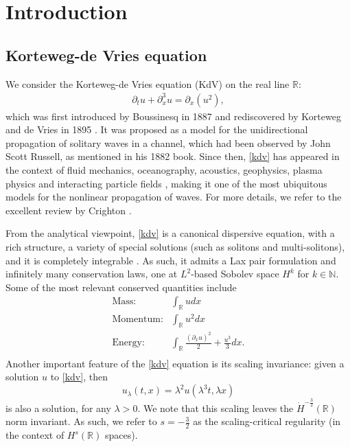 \documentclass[%
11pt,  reqno]{amsart}
\newcommand{\blue}{\color{blue}}
\newcommand{\5}{\textup{V}}
\newcommand{\dx}{\partial_x}
\newcommand{\dt}{\partial_t}
\theoremstyle{remark}
\newcommand{\R}{\mathbb{R}}
\newcommand{\N}{\mathbb{N}}
\numberwithin{equation}{section}
\numberwithin{theorem}{section}
\begin{document}
		



    
    \section{Introduction}


    \subsection{Korteweg-de Vries equation}


We consider the Korteweg-de Vries equation (KdV) on the real line $\R$:
	\begin{align}
		\label{kdv}\tag{KdV}
		\dt u + \dx^3 u = \dx(u^2),
	\end{align}
	which was first introduced by Boussinesq in 1887 \cite{Boussinesq} and rediscovered by Korteweg and de Vries in 1895 \cite{KortewegDeVries}. It was proposed as a model for the unidirectional propagation of solitary waves in a channel, which had been observed by John Scott Russell, as mentioned in his 1882 book\cite{Russell}. Since then, \eqref{kdv} has appeared in the context of fluid mechanics, oceanography, acoustics, geophysics, plasma physics and interacting particle fields \cite{Fordy, CCR_particle,  Kuznetsov_Nakoryakov_Pokusaev_Shreiber_1978,    Nezlin, OlsonChristensen, StewartCorones,WashimiTaniuti}, making it one of the most ubiquitous models for the nonlinear propagation of waves. For more details, we refer to the excellent review by Crighton \cite{Crighton}.
	
	\medskip


From the analytical viewpoint, \eqref{kdv} is a canonical dispersive equation, with a rich structure, a variety of special solutions (such as solitons and multi-solitons), and it is completely integrable \cite{ZakharovFadeev}. As such, it admits a Lax pair formulation and infinitely many conservation laws, one at $L^2$-based Sobolev space $H^k$ for $k\in\N$. Some of the most relevant conserved quantities include
\begin{align*}
\text{Mass:}& \int_\R u dx\\
\text{Momentum:}& \int_\R u^2 dx\\
\text{Energy:}& \int_\R \frac{(\dx u)^2}{2} + \frac{u^3}{3}  dx.\\
\end{align*}
Another important feature of the \eqref{kdv} equation is its scaling invariance: given a solution $u$ to \eqref{kdv}, then
\begin{equation}\label{scaling}
u_\lambda(t,x)=\lambda^{2}u(\lambda^3 t, \lambda x)
\end{equation}
is also a solution, for any $\lambda>0$. We note that this scaling leaves the $\dot H^{-\frac32}(\R)$ norm invariant. As such, we refer to $s=-\frac32$ as the scaling-critical regularity (in the context of $H^s(\R)$ spaces).  
\end{document}
